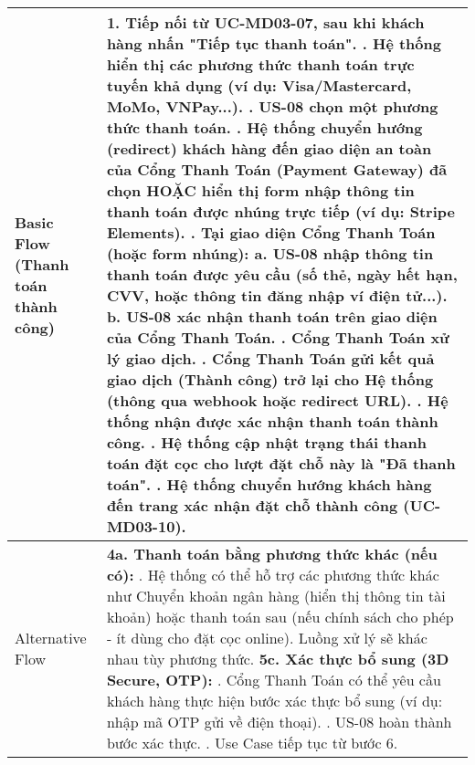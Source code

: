 \begin{longtable}{|m{4cm}|p{11cm}|}
Basic Flow (Thanh toán thành công) & 1. Tiếp nối từ UC-MD03-07, sau khi khách hàng nhấn "Tiếp tục thanh toán". \newline 2. Hệ thống hiển thị các phương thức thanh toán trực tuyến khả dụng (ví dụ: Visa/Mastercard, MoMo, VNPay...). \newline 3. US-08 chọn một phương thức thanh toán. \newline 4. Hệ thống chuyển hướng (redirect) khách hàng đến giao diện an toàn của Cổng Thanh Toán (Payment Gateway) đã chọn HOẶC hiển thị form nhập thông tin thanh toán được nhúng trực tiếp (ví dụ: Stripe Elements). \newline 5. Tại giao diện Cổng Thanh Toán (hoặc form nhúng): \newline    a. US-08 nhập thông tin thanh toán được yêu cầu (số thẻ, ngày hết hạn, CVV, hoặc thông tin đăng nhập ví điện tử...). \newline    b. US-08 xác nhận thanh toán trên giao diện của Cổng Thanh Toán. \newline 6. Cổng Thanh Toán xử lý giao dịch. \newline 7. Cổng Thanh Toán gửi kết quả giao dịch (Thành công) trở lại cho Hệ thống (thông qua webhook hoặc redirect URL). \newline 8. Hệ thống nhận được xác nhận thanh toán thành công. \newline 9. Hệ thống cập nhật trạng thái thanh toán đặt cọc cho lượt đặt chỗ này là "Đã thanh toán". \newline 10. Hệ thống chuyển hướng khách hàng đến trang xác nhận đặt chỗ thành công (UC-MD03-10). \\
\hline
Alternative Flow & \textbf{4a. Thanh toán bằng phương thức khác (nếu có):} \newline    1. Hệ thống có thể hỗ trợ các phương thức khác như Chuyển khoản ngân hàng (hiển thị thông tin tài khoản) hoặc thanh toán sau (nếu chính sách cho phép - ít dùng cho đặt cọc online). Luồng xử lý sẽ khác nhau tùy phương thức. \newline \textbf{5c. Xác thực bổ sung (3D Secure, OTP):} \newline    1. Cổng Thanh Toán có thể yêu cầu khách hàng thực hiện bước xác thực bổ sung (ví dụ: nhập mã OTP gửi về điện thoại). \newline    2. US-08 hoàn thành bước xác thực. \newline    3. Use Case tiếp tục từ bước 6. \\
\hline

\end{longtable}
